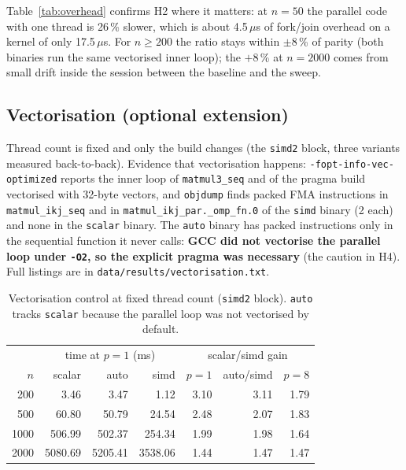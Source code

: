 \documentclass[11pt,a4paper]{article}
\begin{document}
Table~\ref{tab:overhead} confirms H2 where it matters: at $n=50$ the
parallel code with one thread is 26\,\% slower, which is about
4.5\,$\mu$s of fork/join overhead on a kernel of only 17.5\,$\mu$s. For $n
\ge 200$ the ratio stays within $\pm 8$\,\% of parity (both binaries run
the same vectorised inner loop); the $+8$\,\% at $n=2000$ comes from small
drift inside the session between the baseline and the sweep.

\subsection{Vectorisation (optional extension)}

Thread count is fixed and only the build changes (the \texttt{simd2}
block, three variants measured back-to-back). Evidence that vectorisation
happens: \texttt{-fopt-info-vec-optimized} reports the inner loop of
\texttt{matmul3\_seq} and of the pragma build vectorised with 32-byte
vectors, and \texttt{objdump} finds packed FMA instructions in
\texttt{matmul\_ikj\_seq} and in \texttt{matmul\_ikj\_par.\_omp\_fn.0} of
the \texttt{simd} binary (2 each) and none in the \texttt{scalar} binary.
The \texttt{auto} binary has packed instructions only in the sequential
function it never calls: \textbf{GCC did not vectorise the parallel loop
under \texttt{-O2}, so the explicit pragma was necessary} (the caution in
H4). Full listings are in \texttt{data/results/vectorisation.txt}.

\begin{table}[h!]
\centering
\small
\begin{tabular}{rrrrrrr}
\toprule
 & \multicolumn{3}{c}{time at $p=1$ (ms)} & \multicolumn{3}{c}{scalar/simd gain} \\
$n$ & scalar & auto & simd & $p{=}1$ & auto/simd & $p{=}8$ \\
\midrule
200  & 3.46    & 3.47    & 1.12    & 3.10 & 3.11 & 1.79 \\
500  & 60.80   & 50.79   & 24.54   & 2.48 & 2.07 & 1.83 \\
1000 & 506.99  & 502.37  & 254.34  & 1.99 & 1.98 & 1.64 \\
2000 & 5080.69 & 5205.41 & 3538.06 & 1.44 & 1.47 & 1.47 \\
\bottomrule
\end{tabular}
\caption{Vectorisation control at fixed thread count (\texttt{simd2} block).
\texttt{auto} tracks \texttt{scalar} because the parallel loop was not
vectorised by default.}
\label{tab:simd}
\end{table}
\end{document}
